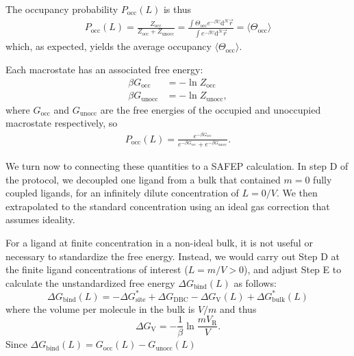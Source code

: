 \documentclass[9pt,tutorial]{Styling/livecoms}
\begin{document}
The occupancy probability $P_\mathrm{occ}(L)$ is thus  
\begin{align}\label{eq:probability1.5}
    P_\mathrm{occ}(L)=\frac{Z_{\mathrm{occ}}} {Z_{\mathrm{occ}} + Z_{\mathrm{unocc}}}=\frac{\int \Theta_\mathrm{occ} e^{-\beta U} \mathrm{d}^N\vec{r}} {\int e^{-\beta U}\mathrm{d}^N\vec{r}}=\langle \Theta_\mathrm{occ}\rangle
\end{align} 
which, as expected, yields the average occupancy $\langle \Theta_\mathrm{occ}\rangle$.  

Each macrostate has an associated free energy: 
\begin{align}
    \beta G_\mathrm{occ}&=-\ln Z_\mathrm{occ}\\
    \beta G_\mathrm{unocc}&=-\ln Z_\mathrm{unocc},
\end{align}
where $G_\mathrm{occ}$ and $G_\mathrm{unocc}$ are the free energies of the occupied and unoccupied macrostate respectively, so 
\begin{align}
    P_\mathrm{occ}(L)=\frac{e^{-\beta G_\mathrm{occ}}} {e^{-\beta G_\mathrm{occ}} + e^{-\beta G_\mathrm{unocc}}}.\label{eq:ApE:probability2}
\end{align}

We turn now to connecting these quantities to a SAFEP calculation.  In step D of the protocol, we decoupled one ligand from a bulk that contained $m=0$ fully coupled ligands, for an infinitely dilute concentration of $L=0/V$. We then extrapolated to the standard concentration using an ideal gas correction that assumes ideality.

For a ligand at finite concentration in a non-ideal bulk, it is not useful or necessary to standardize the free energy. Instead, we would carry out Step D at the finite ligand concentrations of interest ($L=m/V>0$), and adjust Step E to calculate the unstandardized free energy $\Delta G_\mathrm{bind}(L)$ as follows: 
\begin{equation}
\Delta G_\mathrm{bind}(L)= - \Delta G_\mathrm{site}^* + \Delta G_\mathrm{DBC} -\Delta G_\mathrm{V}(L)+ \Delta G^*_\mathrm{bulk}(L)
\end{equation} 
where the volume per molecule in the bulk is $V/m$ and thus \begin{equation}
\label{eq:idealGas}
    \Delta G_\mathrm{V}= -\frac{1}{\beta} \ln \frac{m V_\mathrm{R}}{V}. 
\end{equation}
Since
    $\Delta G_\mathrm{bind}(L) = G_\mathrm{occ}(L) - G_\mathrm{unocc}(L)$
\end{document}
